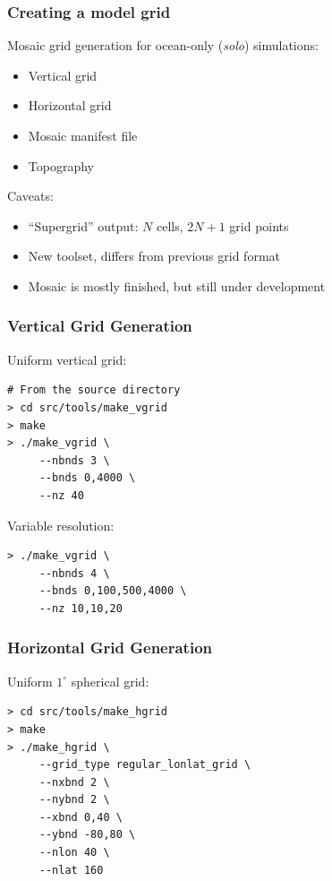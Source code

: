 \documentclass[red]{beamer}
\begin{document}
\begin{frame}
    \frametitle{Creating a model grid}
    
    Mosaic grid generation for ocean-only (\textit{solo}) simulations:
    \begin{itemize}
        \item Vertical grid
        \item Horizontal grid
        \item Mosaic manifest file
        \item Topography
    \end{itemize}
    
    Caveats:
    \begin{itemize}
        \item ``Supergrid'' output: $N$ cells, $2N+1$ grid points
        \item New toolset, differs from previous grid format
        \item Mosaic is mostly finished, but still under development
    \end{itemize}
\end{frame}

\begin{frame}[fragile]
    \frametitle{Vertical Grid Generation}
    
    Uniform vertical grid:
    \begin{lstlisting}
# From the source directory
> cd src/tools/make_vgrid
> make
> ./make_vgrid \
     --nbnds 3 \
     --bnds 0,4000 \
     --nz 40
    \end{lstlisting}
    
    Variable resolution:
    \begin{lstlisting}
> ./make_vgrid \
     --nbnds 4 \
     --bnds 0,100,500,4000 \
     --nz 10,10,20
    \end{lstlisting}
\end{frame}
\begin{frame}[fragile]
    \frametitle{Horizontal Grid Generation}
   
    Uniform $1^\circ$ spherical grid:
    \begin{lstlisting}
> cd src/tools/make_hgrid
> make
> ./make_hgrid \
     --grid_type regular_lonlat_grid \
     --nxbnd 2 \
     --nybnd 2 \
     --xbnd 0,40 \
     --ybnd -80,80 \
     --nlon 40 \
     --nlat 160
    \end{lstlisting}
\end{frame}
\end{document}
